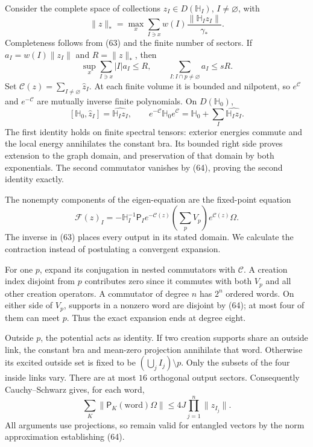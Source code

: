 \documentclass[
  11pt,
]{article}
\begin{document}
Consider the complete space of collections \(z_I\in D(\mathbb H_I)\),
\(I\ne\varnothing\), with \[
 \|z\|_*=\max_x\sum_{I\ni x}
       w(I)\frac{\|\mathbb H_Iz_I\|}{\gamma_*}.
 \tag{66}
\] Completeness follows from (63) and the finite number of sectors. If
\(a_I=w(I)\|z_I\|\) and \(R=\|z\|_*\), then \[
 \sup_x\sum_{I\ni x}|I|a_I\le R,\qquad
 \sum_{I:I\cap p\ne\varnothing}a_I\le sR .
\] Set \(\mathscr C(z)=\sum_{I\ne\varnothing}\widehat z_I\). At each
finite volume it is bounded and nilpotent, so \(e^{\mathscr C}\) and
\(e^{-\mathscr C}\) are mutually inverse finite polynomials. On
\(D(\mathbb H_0)\), \[
 [\mathbb H_0,\widehat z_I]=\widehat{\mathbb H_Iz_I},
 \qquad
 e^{-\mathscr C}\mathbb H_0e^{\mathscr C}
       =\mathbb H_0+\sum_I\widehat{\mathbb H_Iz_I}.
 \tag{67}
\] The first identity holds on finite spectral tensors: exterior
energies commute and the local energy annihilates the constant bra. Its
bounded right side proves extension to the graph domain, and
preservation of that domain by both exponentials. The second commutator
vanishes by (64), proving the second identity exactly.

The nonempty components of the eigen-equation are the fixed-point
equation \[
 \mathcal F(z)_I=-\mathbb H_I^{-1}\mathsf P_I
       e^{-\mathscr C(z)}\left(\sum_pV_p\right)e^{\mathscr C(z)}\Omega .
 \tag{68}
\] The inverse in (63) places every output in its stated domain. We
calculate the contraction instead of postulating a convergent expansion.

For one \(p\), expand its conjugation in nested commutators with
\(\mathscr C\). A creation index disjoint from \(p\) contributes zero
since it commutes with both \(V_p\) and all other creation operators. A
commutator of degree \(n\) has \(2^n\) ordered words. On either side of
\(V_p\), supports in a nonzero word are disjoint by (64); at most four
of them can meet \(p\). Thus the exact expansion ends at degree eight.

Outside \(p\), the potential acts as identity. If two creation supports
share an outside link, the constant bra and mean-zero projection
annihilate that word. Otherwise its excited outside set is fixed to be
\((\bigcup_jI_j)\setminus p\). Only the subsets of the four inside links
vary. There are at most \(16\) orthogonal output sectors. Consequently
Cauchy--Schwarz gives, for each word, \[
 \sum_K\|\mathsf P_K(\text{word})\Omega\|
       \le4J\prod_{j=1}^n\|z_{I_j}\| .
 \tag{69}
\] All arguments use projections, so remain valid for entangled vectors
by the norm approximation establishing (64).
\end{document}
